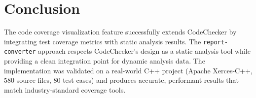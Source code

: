\section{Conclusion}

The code coverage visualization feature successfully extends CodeChecker by integrating test coverage metrics with static analysis results. The \texttt{report-converter} approach respects CodeChecker's design as a static analysis tool while providing a clean integration point for dynamic analysis data. The implementation was validated on a real-world C++ project (Apache Xerces-C++, 580 source files, 80 test cases) and produces accurate, performant results that match industry-standard coverage tools.
